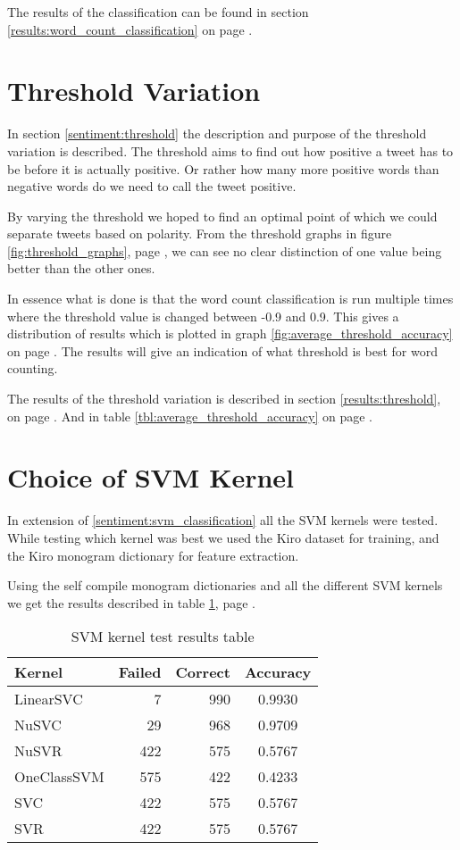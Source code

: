 The results of the classification can be found in section
\ref{results:word_count_classification} on page
\pageref{results:word_count_classification}.
%

\section{Threshold Variation}\label{experiments:threshold}
In section \ref{sentiment:threshold} the description and purpose of the
threshold variation is described. The threshold aims to find out how positive a
tweet has to be before it is actually positive. Or rather how many more
positive words than negative words do we need to call the tweet positive. 

By varying the threshold we hoped to find an optimal point of which we could
separate tweets based on polarity. From the threshold graphs in figure
\ref{fig:threshold_graphs}, page \pageref{fig:threshold_graphs}, we can see no
clear distinction of one value being better than the other ones.

In essence what is done is that the word count classification is run multiple
times where the threshold value is changed between -0.9 and 0.9. This gives a
distribution of results which is plotted in graph
\ref{fig:average_threshold_accuracy} on page
\pageref{fig:average_threshold_accuracy}.
The results will give an indication of what threshold is best for word counting. 

The results of the threshold variation is described in section
\ref{results:threshold}, on page \pageref{results:threshold}. And in table
\ref{tbl:average_threshold_accuracy} on page
\pageref{tbl:average_threshold_accuracy}.
%

\section{Choice of SVM Kernel}\label{experiments:svm_kernel}
In extension of \ref{sentiment:svm_classification} all the SVM kernels were tested. 
While testing which kernel was best we used the Kiro dataset for training, and
the Kiro monogram dictionary for feature extraction.

Using the self compile monogram dictionaries and all the different SVM kernels
we get the results described in table \ref{tbl:svm_classifier_kernel_test}, page
\pageref{tbl:svm_classifier_kernel_test}.

\begin{table}
\centering
\label{tbl:svm_classifier_kernel_test}
\caption{SVM kernel test results table}
\begin{tabular}{ l r r c }
Kernel & Failed & Correct & Accuracy \\
\hline
LinearSVC & 7 & 990 & 0.9930 \\
NuSVC & 29 & 968 & 0.9709 \\
NuSVR & 422 & 575 & 0.5767 \\
OneClassSVM & 575 & 422 & 0.4233 \\
SVC & 422 & 575 & 0.5767 \\
SVR & 422 & 575 & 0.5767 \\
\end{tabular}
\end{table}
%

